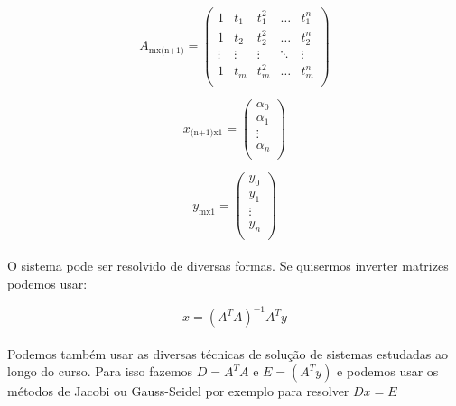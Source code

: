 \begin{minipage}{0.3\textwidth}
\begin{displaymath}
	A_{\mbox{mx(n+1)}} = \left(
	\begin{array}{lllll}
	1 & t_1 & t_1^2 & \ldots & t_1^n \\
	1 & t_2 & t_2^2 & \ldots & t_2^n \\
	\vdots & \vdots & \vdots &\ddots  & \vdots \\
	1 & t_m & t_m^2 & \ldots & t_m^n \\
	\end{array}\right)
\end{displaymath}
\end{minipage}
\hspace{2 cm}
\begin{minipage}{0.3\textwidth}
\begin{displaymath}
	x_{\mbox{(n+1)x1}} = \left(
	\begin{array}{l}
	\alpha_0 \\
	\alpha_1 \\
	\vdots \\
	\alpha_n \\
	\end{array}\right)
\end{displaymath}
\end{minipage}
\begin{minipage}{0.3\textwidth}
\begin{displaymath}
	y_{\mbox{mx1}} = \left(
	\begin{array}{l}
	y_0 \\
	y_1 \\
	\vdots \\
	y_n \\
	\end{array}\right)
\end{displaymath}
\end{minipage}

\paragraph{}O sistema pode ser resolvido de diversas formas. Se quisermos
inverter matrizes podemos usar:

\begin{equation}
	x = (A^T A)^{-1}A^T y
	\label{eq:SolvingSystemGeral}
\end{equation}

\paragraph{} Podemos também usar as diversas técnicas de solução de sistemas
estudadas ao longo do curso. Para isso fazemos $D =A^T A$ e $E=(A^T y)$ e podemos
usar os métodos de Jacobi ou Gauss-Seidel por exemplo para resolver $Dx = E$

